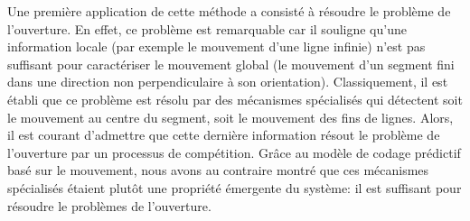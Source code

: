 Une première application de cette méthode a consisté à résoudre le problème de l'ouverture. En effet, ce problème est remarquable car il souligne qu'une information locale (par exemple le mouvement d'une ligne infinie) n'est pas suffisant pour caractériser le mouvement global (le mouvement d'un segment fini dans une direction non perpendiculaire à son orientation). Classiquement, il est établi que ce problème est résolu par des mécanismes spécialisés qui détectent soit le mouvement au centre du segment, soit le mouvement des fins de lignes. Alors, il est courant d'admettre que cette dernière information résout le problème de l'ouverture par un processus de compétition. Grâce au modèle de codage prédictif basé sur le mouvement, nous avons au contraire montré que ces mécanismes spécialisés étaient plutôt une propriété émergente du système: il est suffisant pour résoudre le problèmes de l'ouverture. %

